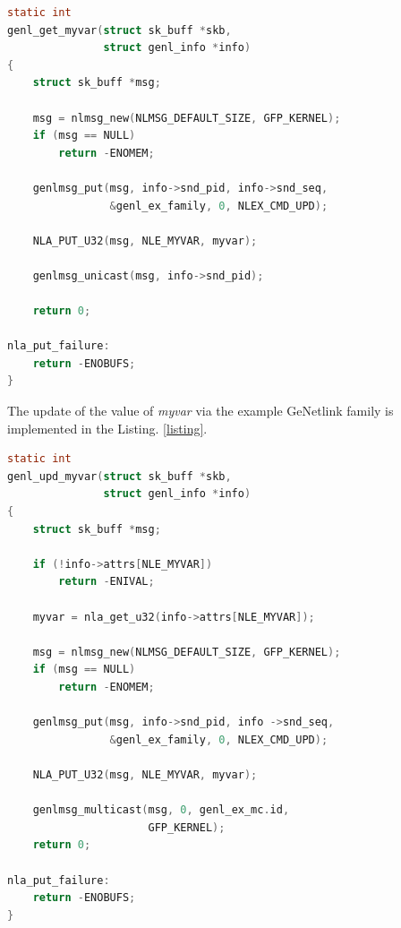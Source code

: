 \documentclass[10pt,onecolumn]{article}
\begin{document}
\begin{lstlisting}[language=C, caption=Get \textit{myvar} routine, label=listing12]
static int
genl_get_myvar(struct sk_buff *skb,
               struct genl_info *info)
{
    struct sk_buff *msg;

    msg = nlmsg_new(NLMSG_DEFAULT_SIZE, GFP_KERNEL);
    if (msg == NULL)
        return -ENOMEM;

    genlmsg_put(msg, info->snd_pid, info->snd_seq,
                &genl_ex_family, 0, NLEX_CMD_UPD);

    NLA_PUT_U32(msg, NLE_MYVAR, myvar);

    genlmsg_unicast(msg, info->snd_pid);

    return 0;

nla_put_failure:
    return -ENOBUFS;
}
\end{lstlisting}

The update of the value of \textit{myvar} via the example GeNetlink family is implemented in the Listing. \ref{listing}.

\begin{lstlisting}[language=C, caption=Update \textit{myvar} routine, label=listing13]
static int
genl_upd_myvar(struct sk_buff *skb,
               struct genl_info *info)
{
    struct sk_buff *msg;

    if (!info->attrs[NLE_MYVAR])
        return -ENIVAL;

    myvar = nla_get_u32(info->attrs[NLE_MYVAR]);

    msg = nlmsg_new(NLMSG_DEFAULT_SIZE, GFP_KERNEL);
    if (msg == NULL)
        return -ENOMEM;

    genlmsg_put(msg, info->snd_pid, info ->snd_seq,
                &genl_ex_family, 0, NLEX_CMD_UPD);

    NLA_PUT_U32(msg, NLE_MYVAR, myvar);

    genlmsg_multicast(msg, 0, genl_ex_mc.id,
                      GFP_KERNEL);
    return 0;

nla_put_failure:
    return -ENOBUFS;
}
\end{lstlisting}
\end{document}
